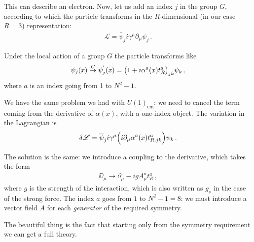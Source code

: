 \documentclass[main.tex]{subfiles}
\begin{document}
This can describe an electron. Now, let us add an index \(j\) in the group \(G\), according to which the particle transforms in the \(R\)-dimensional (in our case \(R=3\)) representation:
\begin{align}
\mathscr{L} = \overline{\psi}_{j} i \gamma^{\mu } \partial_{\mu } \psi_{j}
\,.
\end{align}

Under the local action of a group \(G\) the particle transforms like 
%
\begin{align}
\psi_{j} (x) \overset{G}{\to} 
\psi^{'}_{j} (x)
= \qty(1 + i \alpha^{a}(x) t^{a}_{R})_{jk} \psi_{k} 
\,,
\end{align}
%
where \(a\) is an index going from 1 to \(N^2-1\). 

We have the same problem we had with \(U(1)_{\text{em}}\): we need to cancel the term coming from the derivative of \(\alpha (x)\), with a one-index object.
The variation in the Lagrangian is
%
\begin{align}
\delta \mathscr{L} = \overline{\psi}_{j} i \gamma^{\mu } \qty(i \partial_{\mu } \alpha^{a} (x) t^{a}_{R, jk}) \psi_{k}
\,.
\end{align}

The solution is the same: we introduce a coupling to the derivative, which takes the form
%
\begin{align}
\DD_{\mu } \to \partial_{\mu } - i g A_{\mu }^{a} t^{a}_{R}
\,,
\end{align}
%
where \(g\) is the strength of the interaction, which is also written as \(g_{s}\) in the case of the strong force. 
The index \(a\) goes from \(1\) to \(N^2-1 = 8\): we must introduce a vector field \(A\) for each \emph{generator} of the required symmetry. 

The beautiful thing is the fact that starting only from the symmetry requirement we can get a full theory. 
\end{document}
